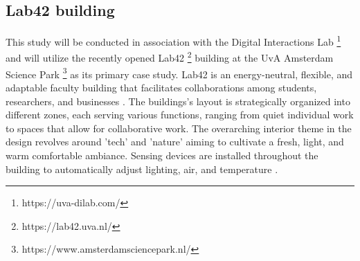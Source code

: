 \subsection{Lab42 building}

This study will be conducted in association with the Digital Interactions Lab \footnote{https://uva-dilab.com/} and will utilize the recently opened Lab42 \footnote{https://lab42.uva.nl/} building at the UvA Amsterdam Science Park \footnote{https://www.amsterdamsciencepark.nl/} as its primary case study. Lab42 is an energy-neutral, flexible, and adaptable faculty building that facilitates collaborations among students, researchers, and businesses \cite{crouwel}. The buildings's layout is strategically organized into different zones, each serving various functions, ranging from quiet individual work to spaces that allow for collaborative work. The overarching interior theme in the design revolves around 'tech' and 'nature' aiming to cultivate a fresh, light, and warm comfortable ambiance. Sensing devices are installed throughout the building to automatically adjust lighting, air, and temperature \cite{faculty}.